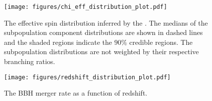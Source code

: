 \begin{figure}[b!]
  \begin{centering}
      \texttt{[image: figures/chi\_eff\_distribution\_plot.pdf]}
      \caption{The effective spin distribution inferred by the \comp{}. The medians of the subpopulation component distributions are shown in dashed lines and the shaded regions indicate the $90\%$ credible regions. The subpopulation distributions are not weighted by their respective branching ratios.}
      \label{fig:chi_eff_distributions}
  \end{centering}
\end{figure}

\begin{figure}[hb!]
  \begin{centering}
      \texttt{[image: figures/redshift\_distribution\_plot.pdf]}
      \caption{The BBH merger rate as a function of redshift.}
      \label{fig:redshift_distribution}
  \end{centering}
\end{figure}


